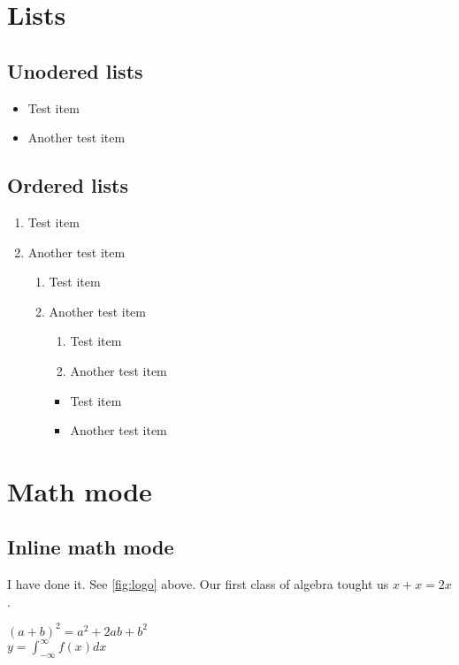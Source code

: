\documentclass[a4paper,12pt]{report}
\begin{document}
	\chapter{Lists}
		\section{Unodered lists}
		\begin{itemize}
			\item Test item
			\item Another test item
		\end{itemize}
		\section{Ordered lists}
		\begin{enumerate}
			\item Test item
			\item Another test item
			\begin{enumerate}
				
			\item Test item
			\item Another test item
				\begin{enumerate}
				
			\item Test item
			\item Another test item
				\end{enumerate}
				\begin{itemize}
				
			\item Test item
			\item Another test item
				\end{itemize}
			\end{enumerate}
		\end{enumerate}
	\chapter{Math mode}
	\section{Inline math mode}
	I have done it. See \ref{fig:logo} above.
	Our first class of algebra tought us $x+x=2x$.
	
	\noindent $(a+b)^2=a^2+2ab+b^2$ \\
	
	$y=\int^{\infty}_{-\infty} f(x)dx$ \\
\end{document}
